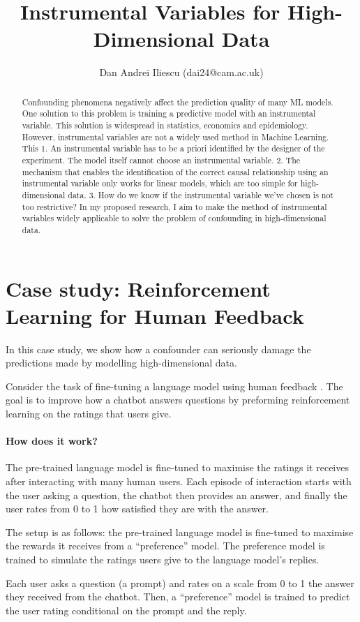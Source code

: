 \documentclass[
  journal=medium,
  manuscript=Qualcomm-Innovation-Fellowship-Proposal,
  year=22-February-2023,
]{cup-journal}
\title{Instrumental Variables for High-Dimensional Data}
\author{Dan Andrei Iliescu (dai24@cam.ac.uk)}
\affiliation{Department of Computer Science and Technology, University of Cambridge, UK}
\begin{document}
\begin{abstract}
Confounding phenomena negatively affect the prediction quality of many ML models.
One solution to this problem is training a predictive model with an instrumental variable.
This solution is widespread in statistics, economics and epidemiology.
However, instrumental variables are not a widely used method in Machine Learning.
This  
1. An instrumental variable has to be a priori identified by the designer of the experiment. The model itself cannot choose an instrumental variable.
2. The mechanism that enables the identification of the correct causal relationship using an instrumental variable only works for linear models, which are too simple for high-dimensional data.
3. How do we know if the instrumental variable we've chosen is not too restrictive?
In my proposed research, I aim to make the method of instrumental variables widely applicable to solve the problem of confounding in high-dimensional data.
\end{abstract}

\section{Case study: Reinforcement Learning for Human Feedback}

In this case study, we show how a confounder can seriously damage the predictions made by modelling high-dimensional data. 

Consider the task of fine-tuning a language model using human feedback \citep{ouyang2022training}. The goal is to improve how a chatbot answers questions by preforming reinforcement learning on the ratings that users give.

\paragraph{How does it work?} The pre-trained language model is fine-tuned to maximise the ratings it receives after interacting with many human users. Each episode of interaction starts with the user asking a question, the chatbot then provides an answer, and finally the user rates from 0 to 1 how satisfied they are with the answer.

The setup is as follows: the pre-trained language model is fine-tuned to maximise the rewards it receives from a ``preference'' model. The preference model is trained to simulate the ratings users give to the language model's replies.

Each user asks a question (a prompt) and rates on a scale from 0 to 1 the answer they received from the chatbot. Then, a ``preference'' model is trained to predict the user rating conditional on the prompt and the reply.
\end{document}
